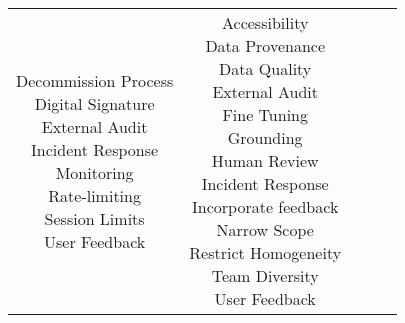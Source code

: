 \documentclass[fleqn]{article}
\begin{document}
\begin{landscape}
\begin{table}[H]
\begin{tabular}{|c|c|c|c|c|}
{			\textbullet\hspace{3pt} Decommission Process\\ 
			\textbullet\hspace{3pt} Digital Signature\\ 	
			\textbullet\hspace{3pt} External Audit\\ 
			\textbullet\hspace{3pt} Incident Response\\ 
			\textbullet\hspace{3pt} Monitoring\\ 	
			\textbullet\hspace{3pt} Rate-limiting \\ 	
			\textbullet\hspace{3pt} Session Limits\\ 
			\textbullet\hspace{3pt} User Feedback\\ 						 	 
		} 
		& \makecell[l]{
			\textbullet\hspace{3pt} Accessibility \\ 	
			\textbullet\hspace{3pt} Data Provenance\\ 	
			\textbullet\hspace{3pt} Data Quality\\ 	
			\textbullet\hspace{3pt} External Audit\\ 	
			\textbullet\hspace{3pt} Fine Tuning\\ 	
			\textbullet\hspace{3pt} Grounding\\ 	
			\textbullet\hspace{3pt} Human Review \\ 	
			\textbullet\hspace{3pt} Incident Response\\ 	
			\textbullet\hspace{3pt} Incorporate feedback \\ 	
			\textbullet\hspace{3pt} Narrow Scope\\  
			\textbullet\hspace{3pt} Restrict Homogeneity\\ 				
			\textbullet\hspace{3pt} Team Diversity\\ 	
			\textbullet\hspace{3pt} User Feedback\\ 	
}
\end{tabular}
\end{table}
\end{landscape}
\end{document}
